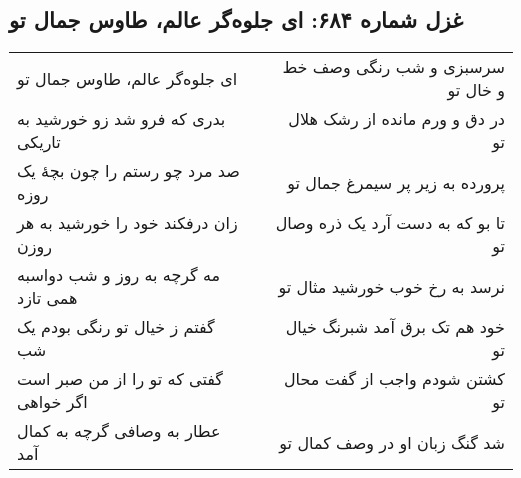 \begin{center}
\section*{غزل شماره ۶۸۴: ای جلوه‌گر عالم، طاوس جمال تو}
\label{sec:684}
\begin{longtable}{l p{0.5cm} r}
ای جلوه‌گر عالم، طاوس جمال تو
&&
سرسبزی و شب رنگی وصف خط و خال تو
\\
بدری که فرو شد زو خورشید به تاریکی
&&
در دق و ورم مانده از رشک هلال تو
\\
صد مرد چو رستم را چون بچهٔ یک روزه
&&
پرورده به زیر پر سیمرغ جمال تو
\\
زان درفکند خود را خورشید به هر روزن
&&
تا بو که به دست آرد یک ذره وصال تو
\\
مه گرچه به روز و شب دواسبه همی تازد
&&
نرسد به رخ خوب خورشید مثال تو
\\
گفتم ز خیال تو رنگی بودم یک شب
&&
خود هم تک برق آمد شبرنگ خیال تو
\\
گفتی که تو را از من صبر است اگر خواهی
&&
کشتن شودم واجب از گفت محال تو
\\
عطار به وصافی گرچه به کمال آمد
&&
شد گنگ زبان او در وصف کمال تو
\\
\end{longtable}
\end{center}
